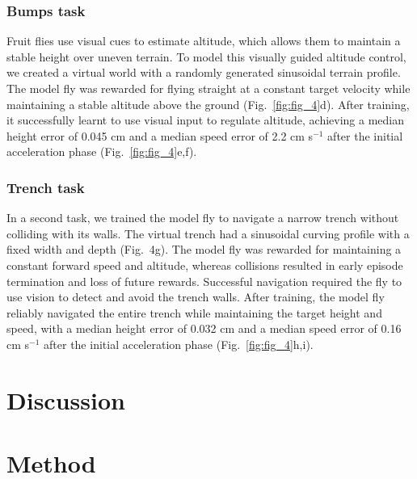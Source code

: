 \documentclass[sn-mathphys-num]{sn-jnl}%
\theoremstyle{thmstyleone}%
\theoremstyle{thmstyletwo}%
\theoremstyle{thmstylethree}%
\begin{document}
\subsubsection{Bumps task}

Fruit flies use visual cues to estimate altitude, which allows them to maintain a stable height over uneven terrain\cite{straw2010visual}. 
To model this visually guided altitude control, we created a virtual world with a randomly generated sinusoidal terrain profile. 
The model fly was rewarded for flying straight at a constant target velocity while maintaining a stable altitude above the ground (Fig.~\ref{fig:fig_4}d). 
After training, it successfully learnt to use visual input to regulate altitude, achieving a median height error of 0.045 cm and a median speed error of 2.2 cm s$ ^{-1} $ after the initial acceleration phase (Fig.~\ref{fig:fig_4}e,f).


\subsubsection{Trench task}

In a second task, we trained the model fly to navigate a narrow trench without colliding with its walls. 
The virtual trench had a sinusoidal curving profile with a fixed width and depth (Fig. 4g). 
The model fly was rewarded for maintaining a constant forward speed and altitude, whereas collisions resulted in early episode termination and loss of future rewards. 
Successful navigation required the fly to use vision to detect and avoid the trench walls. 
After training, the model fly reliably navigated the entire trench while maintaining the target height and speed, with a median height error of 0.032 cm and a median speed error of 0.16 cm s$ ^{-1} $ after the initial acceleration phase (Fig.~\ref{fig:fig_4}h,i).







\section{Discussion}

\section{Method} \label{sec:method}

\end{document}
